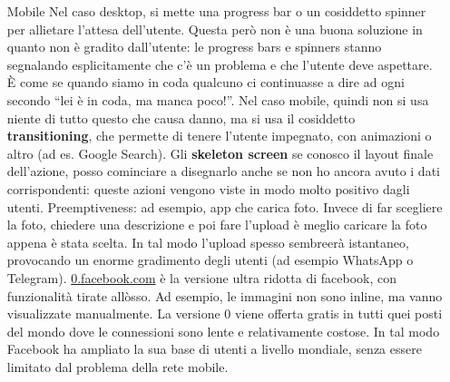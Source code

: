 \begin{enumerate}
\begin{enumerate}
\item[Mobile] Nel caso desktop, si mette una progress bar o un cosiddetto spinner per allietare l'attesa dell'utente. Questa per\`o non \`e una buona soluzione in quanto non \`e gradito dall'utente: le progress bars e spinners stanno segnalando esplicitamente che c'\`e un problema e che l'utente deve aspettare. \`E come se quando siamo in coda qualcuno ci continuasse a dire ad ogni secondo ``lei \`e in coda, ma manca poco!''. Nel caso mobile, quindi non si usa niente di tutto questo che causa danno, ma si usa il cosiddetto \textbf{transitioning}, che permette di tenere l'utente impegnato, con animazioni o altro (ad es. Google Search). Gli \textbf{skeleton screen} se conosco il layout finale dell'azione, posso cominciare a disegnarlo anche se non ho ancora avuto i dati corrispondenti: queste azioni vengono viste in modo molto positivo dagli utenti.  Preemptiveness: ad esempio, app che carica foto. Invece di far scegliere la foto, chiedere una descrizione e poi fare l'upload \`e meglio caricare la foto appena \`e stata scelta. In tal modo l'upload spesso sembreer\`a istantaneo, provocando un enorme gradimento degli utenti (ad esempio WhatsApp o Telegram). \url{0.facebook.com} \`e la versione ultra ridotta di facebook, con funzionalit\`a tirate all\`osso. Ad esempio, le immagini non sono inline, ma vanno visualizzate manualmente. La versione 0 viene offerta gratis in tutti quei posti del mondo dove le connessioni sono lente  e relativamente costose. In tal modo Facebook ha ampliato la sua base di utenti a livello mondiale, senza essere limitato dal problema della rete mobile.


\end{enumerate}
\end{enumerate}
